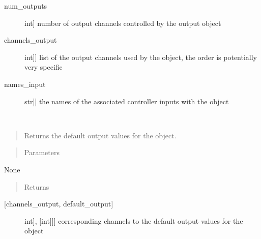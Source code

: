 \documentclass[letterpaper,10pt,english]{sphinxmanual}
\begin{document}
\begin{fulllineitems}
\begin{fulllineitems}
\begin{description}
\item[{num\_outputs}] \leavevmode{[}int{]}
\sphinxAtStartPar
number of output channels controlled by the output object

\item[{channels\_output}] \leavevmode{[}{[}int{]}{]}
\sphinxAtStartPar
list of the output channels used by the object, the order is potentially very specific

\item[{names\_input}] \leavevmode{[}{[}str{]}{]}
\sphinxAtStartPar
the names of the associated controller inputs with the object

\end{description}

\end{fulllineitems}


\begin{fulllineitems}
\label{\detokenize{specific:NeckTiltOutput.NeckTiltOutput.get_default_outputs}}~\begin{quote}

\sphinxAtStartPar
Returns the default output values for the object.
\end{quote}
\begin{quote}\begin{description}
\item[{Parameters}] \leavevmode
\end{description}\end{quote}

\sphinxAtStartPar
None
\begin{quote}\begin{description}
\item[{Returns}] \leavevmode
\end{description}\end{quote}
\begin{description}
\item[{{[}channels\_output, default\_output{]}}] \leavevmode{[}{[}{[}int{]}, {[}int{]}{]}{]}
\sphinxAtStartPar
corresponding channels to the default output values for the object

\end{description}

\end{fulllineitems}


\end{fulllineitems}
\end{document}
